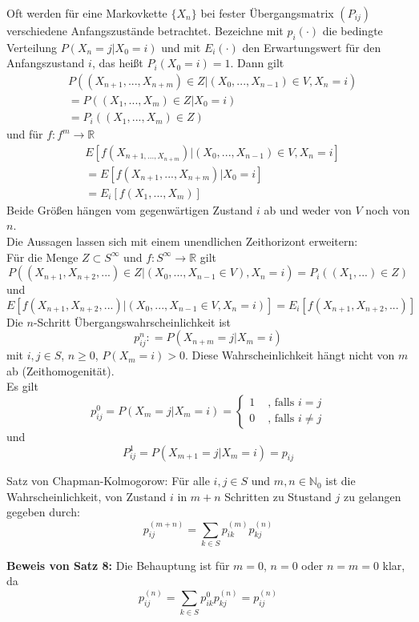 \documentclass[a4paper,12pt]{article}
\begin{document}
Oft werden für eine Markovkette $\{X_n\}$ bei fester Übergangsmatrix $(P_{ij})$ verschiedene Anfangszustände betrachtet.
Bezeichne mit $p_i(\cdot)$ die bedingte Verteilung $P(X_n = j | X_0 = i)$ und mit $E_i(\cdot)$ den Erwartungswert für  den Anfangszustand $i$, das heißt $P_i(X_0 = i) = 1$.
Dann gilt 
\begin{align*}
&  P((X_{n+1}, ..., X_{n+m})\in Z | (X_0, ..., X_{n-1})\in V, X_n = i) \\
&= P((X_1, ..., X_m)\in Z | X_0 = i) \\
&	= P_i((X_1, ..., X_m) \in Z)	
\end{align*}
und für $f: f^m \to \mathbb{R}$
\begin{align*}
& E[f(X_{n+1, ..., X_{n+m}})| (X_0, ..., X_{n-1})\in V, X_n = i]\\ 
&=   E[f(X_{n+1}, ..., X_{n+m})| X_0 = i] \\
&=   E_i[f(X_1, ..., X_m)]
\end{align*}
Beide Größen hängen vom gegenwärtigen Zustand $i$ ab und weder von $V$ noch von $n$.\\
Die Aussagen lassen sich mit einem unendlichen Zeithorizont erweitern:\\
Für die Menge $Z \subset S^\infty$ und $f: S^\infty \to \mathbb{R}$ gilt
$$
P((X_{n+1}, X_{n+2}, ...) \in Z | (X_0, ..., X_{n-1}\in V), X_n = i) = P_i((X_1, ...)\in Z)
$$
und
$$
E[f(X_{n+1}, X_{n+2}, ...)|(X_0, ..., X_{n-1} \in V, X_n = i)] = E_i[f(X_{n+1}, X_{n+2}, ...)]
$$
Die $n$-Schritt Übergangswahrscheinlichkeit ist 
$$
p_{ij}^n : = P(X_{n+m} = j|X_m = i)
$$
mit $i,j \in S$, $n \geq 0$, $P(X_m = i) > 0$. Diese Wahrscheinlichkeit hängt nicht von $m$ ab (Zeithomogenität).\\
Es gilt
$$
p_{ij}^0 = P(X_m = j | X_m = i) = \begin{cases}
1 & \text{ , falls } i = j\\
0 &\text{ , falls } i \neq j  
\end{cases}
$$
und
$$
P_{ij}^1 = P(X_{m+1} = j | X_m = i) = p_{ij}
$$
\begin{tcolorbox}[breakable, colframe=green, colback=white, title=Satz 8]
Satz von Chapman-Kolmogorow: Für alle $i,j \in S$ und $m,n \in \mathbb{N}_0$ ist die Wahrscheinlichkeit, von Zustand $i$ in $m+n$ Schritten zu Stustand $j$ zu gelangen gegeben durch:
$$
p_{ij}^{(m+n)} = \sum_{k \in S} p_{ik}^{(m)}p_{kj}^{(n)}
$$
\end{tcolorbox}
\textbf{Beweis von Satz 8:}
Die Behauptung ist für $m=0$, $n=0$ oder $n=m=0$ klar, da
$$
p_{ij}^{(n)} = \sum_{k \in S} p_{ik}^{0}p_{kj}^{(n)} = p_{ij}^{(n)}
$$
\end{document}

